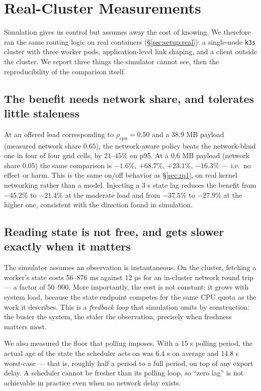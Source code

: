\section{Real-Cluster Measurements}
\label{sec:real}

Simulation gives us control but assumes away the cost of knowing. We therefore ran the same
routing logic on real containers (\S\ref{sec:setup:real}): a single-node \texttt{k3s} cluster with
three worker pods, application-level link shaping, and a client outside the cluster. We report
three things the simulator cannot see, then the reproducibility of the comparison itself.

\subsection{The benefit needs network share, and tolerates little staleness}
At an offered load corresponding to $\rho_{\text{cpu}}=0.50$ and a 38.9 MB payload
(measured network share $0.65$), the network-aware policy beats the network-blind one in four of
four grid cells, by $21$--$45\%$ on p95. At a 0.6 MB payload (network share
$0.05$) the same comparison is $-1.6\%$, $+68.7\%$, $+23.1\%$, $-16.3\%$ --- i.e.~no effect or
harm. This is the same on/off behavior as \S\ref{sec:rq1}, on real kernel networking rather than
a model. Injecting a 3 s state lag reduces the benefit from $-45.2\%$ to $-21.4\%$ at
the moderate load and from $-37.5\%$ to $-27.9\%$ at the higher one, consistent with the
direction found in simulation.

\subsection{Reading state is not free, and gets slower exactly when it matters}
The simulator assumes an observation is instantaneous. On the cluster, fetching a worker's state
costs 56--876 ms against 12 µs for an in-cluster network
round trip --- a factor of \numrange{50}{900}. More importantly, the cost is not constant: it
grows with system load, because the state endpoint competes for the same CPU quota as the work it
describes. This is a \emph{feedback loop} that simulation omits by construction: the busier the
system, the staler the observation, precisely when freshness matters most.

We also measured the floor that polling imposes. With a 15 s polling period, the
actual age of the state the scheduler acts on was 6.4 s on average and
14.8 s worst-case --- that is, roughly half a period to a full period, on top of any
export delay. A scheduler cannot be fresher than its polling loop, so ``zero lag'' is not
achievable in practice even when no network delay exists.

